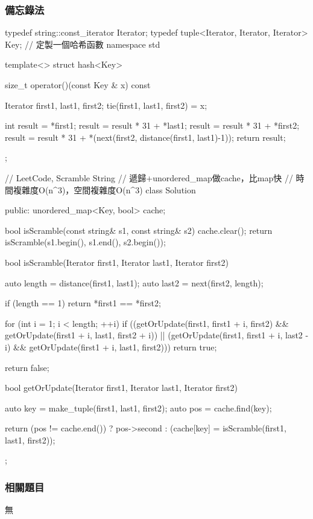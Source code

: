 \subsubsection{備忘錄法}
\begin{Code}
typedef string::const_iterator Iterator;
typedef tuple<Iterator, Iterator, Iterator> Key;
// 定製一個哈希函數
namespace std {
template<> struct hash<Key> {
    size_t operator()(const Key & x) const {
        Iterator first1, last1, first2;
        tie(first1, last1, first2) = x;

        int result = *first1;
        result = result * 31 + *last1;
        result = result * 31 + *first2;
        result = result * 31 + *(next(first2, distance(first1, last1)-1));
        return result;
    }
};
}

// LeetCode, Scramble String
// 遞歸+unordered_map做cache，比map快
// 時間複雜度O(n^3)，空間複雜度O(n^3)
class Solution {
public:
    unordered_map<Key, bool> cache;

    bool isScramble(const string& s1, const string& s2) {
        cache.clear();
        return isScramble(s1.begin(), s1.end(), s2.begin());
    }

    bool isScramble(Iterator first1, Iterator last1, Iterator first2) {
        auto length = distance(first1, last1);
        auto last2 = next(first2, length);

        if (length == 1)
            return *first1 == *first2;

        for (int i = 1; i < length; ++i)
            if ((getOrUpdate(first1, first1 + i, first2)
                    && getOrUpdate(first1 + i, last1, first2 + i))
                    || (getOrUpdate(first1, first1 + i, last2 - i)
                            && getOrUpdate(first1 + i, last1, first2)))
                return true;

        return false;
    }

    bool getOrUpdate(Iterator first1, Iterator last1, Iterator first2) {
        auto key = make_tuple(first1, last1, first2);
        auto pos = cache.find(key);

        return (pos != cache.end()) ?
                pos->second : (cache[key] = isScramble(first1, last1, first2));
    }
};
\end{Code}


\subsubsection{相關題目}
\begindot
\item 無
\myenddot


